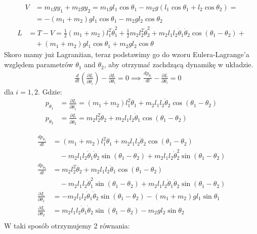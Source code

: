 \documentclass[]{article}
\begin{document}
	\begin{align*}
		V &= m_1 g y_1 + m_2 g y_2 
		= m_1 g l_1 \cos \theta_1 - m_2 g (l_1 \cos \theta_1 + l_2 \cos \theta_2)= \\
		&= -(m_1 + m_2) g l_1 \cos \theta_1 - m_2 g l_2 \cos \theta_2
	\end{align*}
	\begin{align*}
		L &=T-V= \frac{1}{2} (m_1 + m_2) l_1^2 \dot{\theta}_1^2 + \frac{1}{2} m_2 l_2^2 \dot{\theta}_2^2 + m_2 l_1 l_2 \dot{\theta}_1 \dot{\theta}_2 \cos(\theta_1 - \theta_2) +\\
		&\quad + (m_1 + m_2) g l_1 \cos \theta_1 + m_2 g l_2 \cos \theta
	\end{align*}
	Skoro mamy już Lagranżian, teraz podstawimy go do wzoru Eulera-Lagrange'a względem parametrów $\theta_1$ and $\theta_2$, aby otrzymać zachdzącą dynamikę w układzie.\\

	\begin{align*}
		\frac{d}{dt} \left( \frac{\partial L}{\partial \dot{\theta}_i} \right) - \frac{\partial L}{\partial \theta_i} = 0 \implies \frac{dp_{\theta_i}}{dt} - \frac{\partial L}{\partial \theta_i} = 0 \quad 
	\end{align*}
	dla $i = 1, 2$.
	Gdzie:
	\begin{align*}
		p_{\theta_1} &= \frac{\partial L}{\partial \dot{\theta}_1} = (m_1 + m_2) l_1^2 \dot{\theta}_1 + m_2 l_1 l_2 \dot{\theta}_2 \cos(\theta_1 - \theta_2) \\
		p_{\theta_2} &= \frac{\partial L}{\partial \dot{\theta}_2} = m_2 l_2^2 \dot{\theta}_2 + m_2 l_1 l_2 \dot{\theta}_1 \cos(\theta_1 - \theta_2)
	\end{align*}
	
	\begin{align*}
		\frac{dp_{\theta_1}}{dt} &= (m_1 + m_2) l_1^2 \ddot{\theta}_1 + m_2 l_1 l_2 \ddot{\theta}_2 \cos(\theta_1 - \theta_2) \\
		&\quad - m_2 l_1 l_2 \dot{\theta}_1 \dot{\theta}_2 \sin(\theta_1 - \theta_2) + m_2 l_1 l_2 \dot{\theta}_2^2 \sin(\theta_1 - \theta_2) \\
		\frac{dp_{\theta_2}}{dt} &= m_2 l_2^2 \ddot{\theta}_2 + m_2 l_1 l_2 \ddot{\theta}_1 \cos(\theta_1 - \theta_2) \\
		&\quad - m_2 l_1 l_2 \dot{\theta}_1^2 \sin(\theta_1 - \theta_2) + m_2 l_1 l_2 \dot{\theta}_1 \dot{\theta}_2 \sin(\theta_1 - \theta_2) \\
		\frac{\partial L}{\partial \theta_1} &= - m_2 l_1 l_2 \dot{\theta}_1 \dot{\theta}_2 \sin(\theta_1 - \theta_2) - (m_1 + m_2) g l_1 \sin \theta_1 \\
		\frac{\partial L}{\partial \theta_2} &= m_2 l_1 l_2 \dot{\theta}_1 \dot{\theta}_2 \sin(\theta_1 - \theta_2) - m_2 g l_2 \sin \theta_2 \\
	\end{align*}
	W taki sposób otrzymujemy 2 równania:
	
\end{document}
